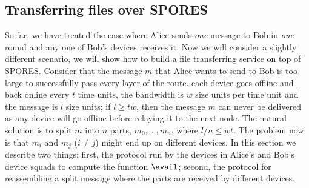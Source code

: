 \subsection{Transferring files over \acs{SPORES}}%
\label{SPORES}
\label{sec:file_exchange}

So far, we have treated the case where Alice sends \emph{one} message to Bob in 
\emph{one} round and any one of Bob's devices receives it.
Now we will consider a slightly different scenario, we will show how to build a 
file transferring service on top of \ac{SPORES}.
Consider that the message \(m\) that Alice wants to send to Bob is too large to 
successfully pass every layer of the route.
\Eg each device goes offline and back online every \(t\) time units, the 
bandwidth is \(w\) size units per time unit and the message is \(l\) size 
units; if \(l\geq t w\), then the message \(m\) can never be delivered as any 
device will go offline before relaying it to the next node.
The natural solution is to split \(m\) into \(n\) parts, \(m_0, \dotsc, m_n\), 
where \(l/n\leq w t\).
The problem now is that \(m_i\) and \(m_j\) (\(i\neq j\)) might end up on 
different devices.
In this section we describe two things:
first, the protocol run by the devices in Alice's and Bob's device squads to 
compute the function \(\avail\);
second, the protocol for reassembling a split message where the parts are 
received by different devices.


